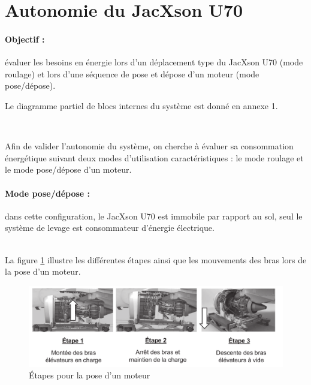 \newpage

\section{Autonomie du JacXson U70}

\paragraph{Objectif :} évaluer les besoins en énergie lors d'un déplacement type du JacXson U70 (mode roulage) et lors d'une séquence de pose et dépose d'un moteur (mode pose/dépose).

Le diagramme partiel de blocs internes du système est donné en annexe 1.


~\

Afin de valider l'autonomie du système, on cherche à évaluer sa consommation énergétique suivant deux modes d'utilisation caractéristiques : le mode roulage et le mode pose/dépose d'un moteur.

\paragraph{Mode pose/dépose :} dans cette configuration, le JacXson U70 est immobile par rapport au sol, seul le système de levage est consommateur d'énergie électrique. \\ ~\

La figure \ref{fig05} illustre les différentes étapes ainsi que les mouvements des bras lors de la pose d'un
moteur.

\begin{figure}[ht!]
\begin{center}
 \includegraphics[width=0.9\linewidth]{img/fig05}
\end{center}
\caption{\label{fig05} Étapes pour la pose d'un moteur}
\end{figure}

